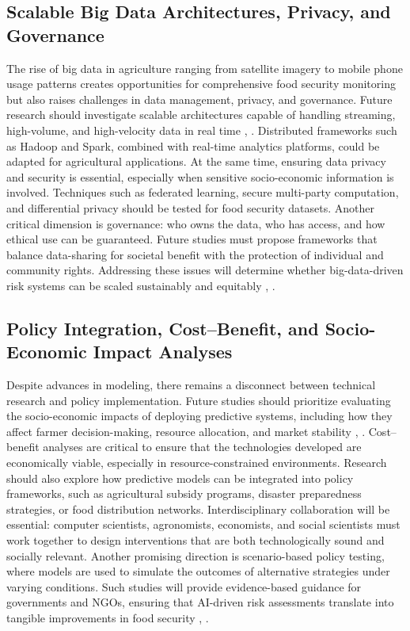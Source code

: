 \documentclass[preprint,12pt]{elsarticle}
\begin{document}
	\subsection{Scalable Big Data Architectures, Privacy, and Governance}
	
	The rise of big data in agriculture ranging from satellite imagery to
	mobile phone usage patterns creates opportunities for comprehensive food
	security monitoring but also raises challenges in data management,
	privacy, and governance. Future research should investigate scalable
	architectures capable of handling streaming, high-volume, and
	high-velocity data in real time \cite{ref68}, \cite{ref83}. Distributed frameworks
	such as Hadoop and Spark, combined with real-time analytics platforms,
	could be adapted for agricultural applications. At the same time,
	ensuring data privacy and security is essential, especially when
	sensitive socio-economic information is involved. Techniques such as
	federated learning, secure multi-party computation, and differential
	privacy should be tested for food security datasets. Another critical
	dimension is governance: who owns the data, who has access, and how
	ethical use can be guaranteed. Future studies must propose frameworks
	that balance data-sharing for societal benefit with the protection of
	individual and community rights. Addressing these issues will determine
	whether big-data-driven risk systems can be scaled sustainably and
	equitably \cite{ref68}, \cite{ref83}.
	
	\subsection{Policy Integration, Cost--Benefit, and Socio-Economic Impact Analyses}
	
	Despite advances in modeling, there remains a disconnect between
	technical research and policy implementation. Future studies should
	prioritize evaluating the socio-economic impacts of deploying predictive
	systems, including how they affect farmer decision-making, resource
	allocation, and market stability \cite{ref83}, \cite{ref67}. Cost--benefit analyses
	are critical to ensure that the technologies developed are economically
	viable, especially in resource-constrained environments. Research should
	also explore how predictive models can be integrated into policy
	frameworks, such as agricultural subsidy programs, disaster preparedness
	strategies, or food distribution networks. Interdisciplinary
	collaboration will be essential: computer scientists, agronomists,
	economists, and social scientists must work together to design
	interventions that are both technologically sound and socially relevant.
	Another promising direction is scenario-based policy testing, where
	models are used to simulate the outcomes of alternative strategies under
	varying conditions. Such studies will provide evidence-based guidance
	for governments and NGOs, ensuring that AI-driven risk assessments
	translate into tangible improvements in food security \cite{ref83}, \cite{ref67}.
	
\end{document}
